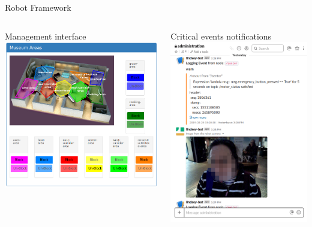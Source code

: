 \documentclass[english,svgnames,notes=hide,14pt]{beamer}
\begin{document}
\begin{frame}[shrink=10]{Robot Framework}
\begin{columns}
\begin{column}{0.65\textwidth}
\begin{block}{Management interface}
            \hspace{1pt}
            \includegraphics[width=0.31\linewidth]{imgs/admin_areas_cut.png}
        \end{block}
    \end{column}
    \begin{column}{0.35\textwidth}
        \vspace{-1cm}
        \begin{block}{Critical events notifications}
            \centering
            \includegraphics[width=0.9\linewidth]{imgs/notifications.png}
        \end{block}
    \end{column}
\end{columns}

\end{frame}
\end{document}
